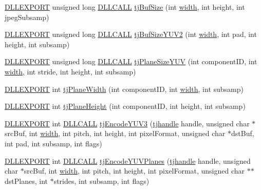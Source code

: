 \begin{DoxyCompactItemize}
\hyperlink{turbojpeg_8h_a808e08638be3cba36e36759e5b150de0}{D\+L\+L\+E\+X\+P\+O\+RT} unsigned long \hyperlink{turbojpeg_8h_a54b25836118bfac94a53a7b790f3ccb2}{D\+L\+L\+C\+A\+LL} \hyperlink{group___turbo_j_p_e_g_gaccc5bca7f12fcdcc302e6e1c6d4b311b}{tj\+Buf\+Size} (int \hyperlink{png_8h_ad46179dbe9c68fdcea52b34c3480ec0f}{width}, int height, int jpeg\+Subsamp)
\item 
\hyperlink{turbojpeg_8h_a808e08638be3cba36e36759e5b150de0}{D\+L\+L\+E\+X\+P\+O\+RT} unsigned long \hyperlink{turbojpeg_8h_a54b25836118bfac94a53a7b790f3ccb2}{D\+L\+L\+C\+A\+LL} \hyperlink{group___turbo_j_p_e_g_gaf451664a62c1f6c7cc5a6401f32908c9}{tj\+Buf\+Size\+Y\+U\+V2} (int \hyperlink{png_8h_ad46179dbe9c68fdcea52b34c3480ec0f}{width}, int pad, int height, int subsamp)
\item 
\hyperlink{turbojpeg_8h_a808e08638be3cba36e36759e5b150de0}{D\+L\+L\+E\+X\+P\+O\+RT} unsigned long \hyperlink{turbojpeg_8h_a54b25836118bfac94a53a7b790f3ccb2}{D\+L\+L\+C\+A\+LL} \hyperlink{group___turbo_j_p_e_g_ga6f98d977bfa9d167c97172e876ba61e2}{tj\+Plane\+Size\+Y\+UV} (int component\+ID, int \hyperlink{png_8h_ad46179dbe9c68fdcea52b34c3480ec0f}{width}, int stride, int height, int subsamp)
\item 
\hyperlink{turbojpeg_8h_a808e08638be3cba36e36759e5b150de0}{D\+L\+L\+E\+X\+P\+O\+RT} int \hyperlink{group___turbo_j_p_e_g_ga63fb66bb1e36c74008c4634360becbb1}{tj\+Plane\+Width} (int component\+ID, int \hyperlink{png_8h_ad46179dbe9c68fdcea52b34c3480ec0f}{width}, int subsamp)
\item 
\hyperlink{turbojpeg_8h_a808e08638be3cba36e36759e5b150de0}{D\+L\+L\+E\+X\+P\+O\+RT} int \hyperlink{group___turbo_j_p_e_g_ga1a209696c6a80748f20e134b3c64789f}{tj\+Plane\+Height} (int component\+ID, int height, int subsamp)
\item 
\hyperlink{turbojpeg_8h_a808e08638be3cba36e36759e5b150de0}{D\+L\+L\+E\+X\+P\+O\+RT} int \hyperlink{turbojpeg_8h_a54b25836118bfac94a53a7b790f3ccb2}{D\+L\+L\+C\+A\+LL} \hyperlink{group___turbo_j_p_e_g_ga0a5ffbf7cb58a5b6a8201114fe889360}{tj\+Encode\+Y\+U\+V3} (\hyperlink{group___turbo_j_p_e_g_ga758d2634ecb4949de7815cba621f5763}{tjhandle} handle, unsigned char $\ast$src\+Buf, int \hyperlink{png_8h_ad46179dbe9c68fdcea52b34c3480ec0f}{width}, int pitch, int height, int pixel\+Format, unsigned char $\ast$dst\+Buf, int pad, int subsamp, int flags)
\item 
\hyperlink{turbojpeg_8h_a808e08638be3cba36e36759e5b150de0}{D\+L\+L\+E\+X\+P\+O\+RT} int \hyperlink{turbojpeg_8h_a54b25836118bfac94a53a7b790f3ccb2}{D\+L\+L\+C\+A\+LL} \hyperlink{group___turbo_j_p_e_g_gaa791db8598853ddcad24e42897ef1269}{tj\+Encode\+Y\+U\+V\+Planes} (\hyperlink{group___turbo_j_p_e_g_ga758d2634ecb4949de7815cba621f5763}{tjhandle} handle, unsigned char $\ast$src\+Buf, int \hyperlink{png_8h_ad46179dbe9c68fdcea52b34c3480ec0f}{width}, int pitch, int height, int pixel\+Format, unsigned char $\ast$$\ast$dst\+Planes, int $\ast$strides, int subsamp, int flags)
$$
\end{DoxyCompactItemize}
